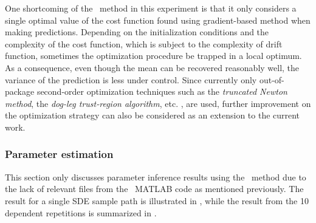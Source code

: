 One shortcoming of the \algolpmfsde\ method in this experiment is that it only considers a single optimal value of the cost function found using gradient-based method when making predictions.
Depending on the initialization conditions and the complexity of the cost function, which is subject to the complexity of drift function, sometimes the optimization procedure be trapped in a local optimum.
As a consequence, even though the mean can be recovered reasonably well, the variance of the prediction is less under control.
Since currently only out-of-package second-order optimization techniques such as the \emph{truncated Newton method}, the \emph{dog-leg trust-region algorithm}, etc. \citep{nocedal2006numerical}, are used, further improvement on the optimization strategy can also be considered as an extension to the current work.

\subsubsection*{Parameter estimation}

This section only discusses parameter inference results using the \algolpmfsde\ method due to the lack of relevant files from the \algovgpamf\ MATLAB code as mentioned previously.
The result for a single SDE sample path is illustrated in , while the result from the 10 dependent repetitions is summarized in .

